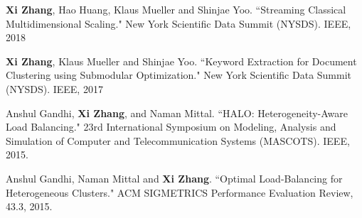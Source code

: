 


\begin{cvpapers}


\item \cvpaper
{\textbf{Xi Zhang}, Hao Huang, Klaus Mueller and Shinjae Yoo. ``Streaming Classical Multidimensional Scaling." New York Scientific Data Summit (NYSDS). IEEE, 2018} 


\item \cvpaper
{\textbf{Xi Zhang}, Klaus Mueller and Shinjae Yoo. ``Keyword Extraction for Document Clustering using Submodular Optimization." New York Scientific Data Summit (NYSDS). IEEE, 2017} 


\item \cvpaper
{Anshul Gandhi, \textbf{Xi Zhang}, and Naman Mittal. ``HALO: Heterogeneity-Aware Load Balancing." 23rd International Symposium on Modeling, Analysis and Simulation of Computer and Telecommunication Systems (MASCOTS). IEEE, 2015.} 


\item \cvpaper
{Anshul Gandhi, Naman Mittal and \textbf{Xi Zhang}. ``Optimal Load-Balancing for Heterogeneous Clusters." ACM SIGMETRICS Performance Evaluation Review, 43.3, 2015.
}

\end{cvpapers}